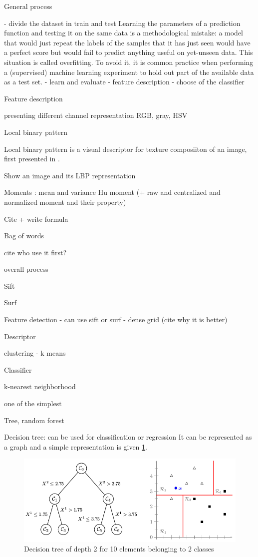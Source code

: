 General process

- divide the dataset in train and test
Learning the parameters of a prediction function and testing it on the same data is a methodological mistake: a model that would just repeat the labels of the samples that it has just seen would have a perfect score but would fail to predict anything useful on yet-unseen data. This situation is called overfitting. To avoid it, it is common practice when performing a (supervised) machine learning experiment to hold out part of the available data as a test set.
- learn and evaluate
- feature description
- choose of the classifier

Feature description

presenting different channel representation
RGB, gray, HSV

Local binary pattern

Local binary pattern is a visual descriptor for texture composiiton of an image, first presented in .

Show an image and its LBP representation




Moments :
mean and variance
Hu moment (+ raw and centralized and normalized moment and their property)

Cite + write formula

Bag of words

cite who use it first?

overall process

Sift

Surf

Feature detection
- can use sift or surf
- dense grid (cite why it is better)

Descriptor

clustering
- k means

Classifier

k-nearest neighborhood

one of the simplest

Tree, random forest

Decision tree: can be used for classification or regression
It can be represented as a graph and a simple representation is given \ref{fig:decision_tree_simple_example}.

\begin{figure}[h]
    \includegraphics[scale=0.5]{img/decision_tree_simple_example}
    \caption{Decision tree of depth 2 for 10 elements belonging to 2 classes}
    \label{fig:decision_tree_simple_example}
\end{figure}


